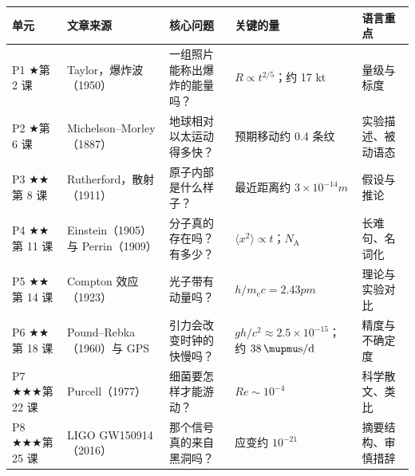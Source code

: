\documentclass[11pt,a4paper]{article}
\begin{document}
\begin{center}
\small
\begin{tabular}{p{1.4cm}>{\raggedright\arraybackslash}p{3.2cm}p{3.9cm}>{\raggedright\arraybackslash}p{3.4cm}>{\raggedright\arraybackslash}p{2.2cm}}
\toprule
\headrow 单元 & 文章来源 & 核心问题 & 关键的量 & 语言重点 \\
\midrule
P1 ★\newline 第 2 课 & Taylor，爆炸波（1950） & 一组照片能称出爆炸的能量吗？ & $R\propto t^{2/5}$；约 17 kt & 量级与标度 \\
\midrule
P2 ★\newline 第 6 课 & Michelson–Morley（1887） & 地球相对以太运动得多快？ & 预期移动约 0.4 条纹 & 实验描述、被动语态 \\
\midrule
P3 ★★\newline 第 8 课 & Rutherford，散射（1911） & 原子内部是什么样子？ & 最近距离约 $3\times10^{-14}\unit{m}$ & 假设与推论 \\
\midrule
P4 ★★\newline 第 11 课 & Einstein（1905）与 Perrin（1909） & 分子真的存在吗？有多少？ & $\langle x^2\rangle\propto t$；$N_\mathrm{A}$ & 长难句、名词化 \\
\midrule
P5 ★★\newline 第 14 课 & Compton 效应（1923） & 光子带有动量吗？ & $h/m_\mathrm{e}c=2.43\unit{pm}$ & 理论与实验对比 \\
\midrule
P6 ★★\newline 第 18 课 & Pound–Rebka（1960）与 GPS & 引力会改变时钟的快慢吗？ & $gh/c^2\approx2.5\times10^{-15}$；约 $38\,\mupmu\mathrm{s/d}$ & 精度与不确定度 \\
\midrule
P7 ★★★\newline 第 22 课 & Purcell（1977） & 细菌要怎样才能游动？ & $\mathit{Re}\sim10^{-4}$ & 科学散文、类比 \\
\midrule
P8 ★★★\newline 第 25 课 & LIGO GW150914（2016） & 那个信号真的来自黑洞吗？ & 应变约 $10^{-21}$ & 摘要结构、审慎措辞 \\
\bottomrule
\end{tabular}
\end{center}
\end{document}
